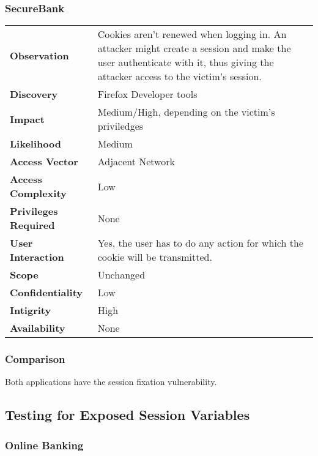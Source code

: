 \subsubsection*{SecureBank}

\begin{tabular}{l|p{10cm}}
\textbf{Observation} & Cookies aren't renewed when logging in. An attacker might create a session and make the user authenticate with it, thus giving the attacker access to the victim's session. \\
\textbf{Discovery} & Firefox Developer tools \\
\textbf{Impact} & Medium/High, depending on the victim's priviledges \\
\textbf{Likelihood} & Medium \\
\textbf{Access Vector} & Adjacent Network \\
\textbf{Access Complexity} & Low\\
\textbf{Privileges Required} & None \\
\textbf{User Interaction} & Yes, the user has to do any action for which the cookie will be transmitted. \\
\textbf{Scope} & Unchanged \\
\textbf{Confidentiality} & Low \\
\textbf{Intigrity} & High\\
\textbf{Availability} & None \\
\end{tabular}

\subsubsection*{Comparison}
Both applications have the session fixation vulnerability.

\clearpage


\subsection{Testing for Exposed Session Variables}

\subsubsection*{Online Banking}

